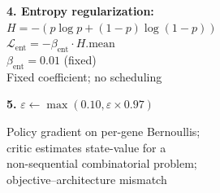\documentclass[8pt]{article}
\newlength{\colw}
\begin{document}
\begin{minipage}[t]{\colw}
\begin{warnbox}
\textbf{4. Entropy regularization:}\\
$H = -(p\log p + (1{-}p)\log(1{-}p))$\\
$\mathcal{L}_\text{ent} = -\beta_\text{ent} \cdot H.\text{mean}$\\
$\beta_\text{ent} = 0.01$ (fixed)\\
{\scriptsize\color{removed} Fixed coefficient; no scheduling}
\end{warnbox}\vspace{1pt}

\begin{stepbox}
\textbf{5.} $\varepsilon \gets \max(0.10, \varepsilon \times 0.97)$
\end{stepbox}

\vspace{3pt}
\begin{center}
{\scriptsize\color{black!50} Policy gradient on per-gene Bernoullis;\\
critic estimates state-value for a\\
non-sequential combinatorial problem;\\
objective--architecture mismatch}
\end{center}
\end{minipage}%
\hfill
\end{document}
